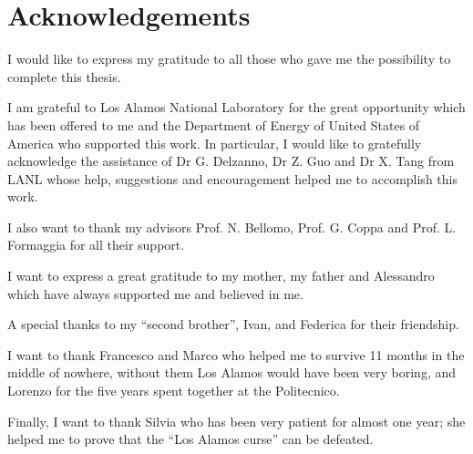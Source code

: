\chapter*{Acknowledgements}

I would like to express my gratitude to all those who gave me the possibility to complete this thesis.

I am grateful to Los Alamos National Laboratory for the great opportunity which has been offered to me and the Department of Energy of United States of America who supported this work. In particular, I would like to gratefully acknowledge the assistance of Dr G. Delzanno, Dr Z. Guo and Dr X. Tang from LANL whose help, suggestions and encouragement helped me to accomplish this work.

I also want to thank my advisors Prof. N. Bellomo, Prof. G. Coppa and Prof. L. Formaggia for all their support.
\medskip

I want to express a great gratitude to my mother, my father and Alessandro which have always supported me and believed in me.

A special thanks to my ``second brother'', Ivan, and Federica for their friendship.

I want to thank Francesco and Marco who helped me to survive 11 months in the middle of nowhere, without them Los Alamos would have been very boring, and Lorenzo for the five years spent together at the Politecnico.

Finally, I want to thank Silvia who has been very patient for almost one year; she helped me to prove that the ``Los Alamos curse'' can be defeated.
